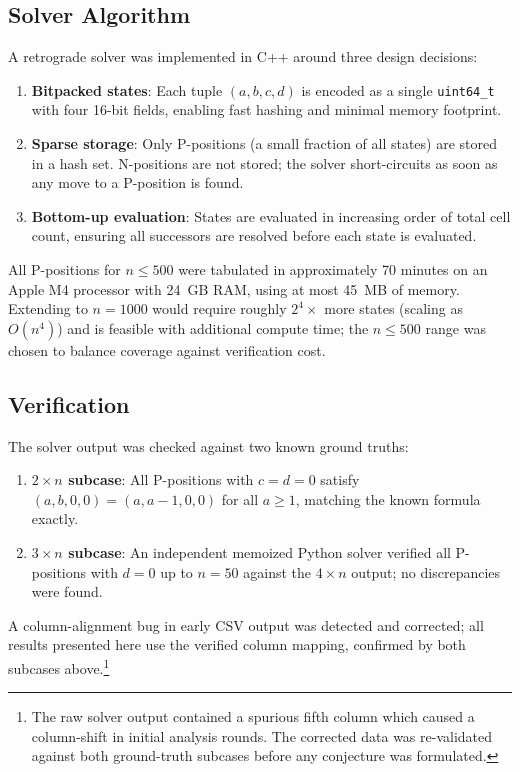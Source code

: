 \documentclass[12pt]{article}
\begin{document}
\subsection{Solver Algorithm}

A retrograde solver was implemented in C++ around three design decisions:
\begin{enumerate}
  \item \textbf{Bitpacked states}: Each tuple $(a,b,c,d)$ is encoded
        as a single \texttt{uint64\_t} with four 16-bit fields, enabling
        fast hashing and minimal memory footprint.
  \item \textbf{Sparse storage}: Only P-positions (a small fraction of
        all states) are stored in a hash set. N-positions are not stored;
        the solver short-circuits as soon as any move to a P-position
        is found.
  \item \textbf{Bottom-up evaluation}: States are evaluated in increasing
        order of total cell count, ensuring all successors are resolved
        before each state is evaluated.
\end{enumerate}

All P-positions for $n \leq 500$ were tabulated in approximately 70 minutes
on an Apple M4 processor with 24~GB RAM, using at most 45~MB of memory.
Extending to $n = 1000$ would require roughly $2^4 \times$ more states
(scaling as $O(n^4)$) and is feasible with additional compute time;
the $n \leq 500$ range was chosen to balance coverage against verification cost.

\subsection{Verification}

The solver output was checked against two known ground truths:
\begin{enumerate}
  \item \textbf{$2 \times n$ subcase}: All P-positions with $c = d = 0$
        satisfy $(a, b, 0, 0) = (a, a-1, 0, 0)$ for all $a \geq 1$,
        matching the known formula exactly.
  \item \textbf{$3 \times n$ subcase}: An independent memoized Python
        solver verified all P-positions with $d = 0$ up to $n = 50$
        against the $4 \times n$ output; no discrepancies were found.
\end{enumerate}

A column-alignment bug in early CSV output was detected and corrected;
all results presented here use the verified column mapping, confirmed by
both subcases above.\footnote{The raw solver output contained a spurious
fifth column which caused a column-shift in initial analysis rounds.
The corrected data was re-validated against both ground-truth subcases
before any conjecture was formulated.}
\end{document}
